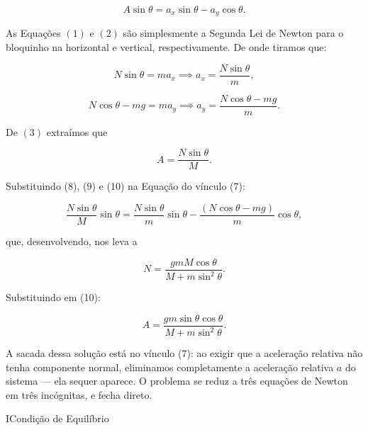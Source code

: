 \begin{exemplo}
\begin{equation*}
A \sin \theta = a_x \sin \theta - a_y \cos \theta. \tag{7}
\end{equation*}

As Equações $(1)$ e $(2)$ são simplesmente a Segunda Lei de Newton para o bloquinho na horizontal e vertical, respectivamente. De onde tiramos que:

\begin{equation*}
N \sin \theta = ma_x \implies \boxed{a_x = \dfrac{N \sin \theta}{m},} \tag{8}
\end{equation*}

\begin{equation*}
N \cos \theta - mg = ma_y \implies \boxed{a_y = \dfrac{N \cos \theta  - mg}{m}.} \tag{9}
\end{equation*}


De $(3)$ extraímos que 

\begin{equation*}
A = \dfrac{N \sin \theta }{M}. \tag{10}
\end{equation*}

Substituindo (8), (9) e (10) na Equação do vínculo (7):


$$ \dfrac{N \sin \theta }{M} \sin \theta = \dfrac{N \sin \theta}{m} \sin \theta - \dfrac{(N \cos \theta  - mg)}{m}\cos \theta,$$

\noindent que, desenvolvendo, nos leva a

$$N = \frac{gmM\cos\theta}{M + m\sin^2\theta}.$$

Substituindo em (10):

$$\boxed{A = \frac{gm\sin\theta\cos\theta}{M + m\sin^2\theta}.}$$

A sacada dessa solução está no vínculo (7): ao exigir que a aceleração relativa não tenha componente normal, eliminamos completamente a aceleração relativa $a$ do sistema
--- ela sequer aparece. O problema se reduz a três equações de Newton em três incógnitas, e fecha direto.

\end{exemplo}



\begin{secnivel}{I}{Condição de Equilíbrio}
  

\end{secnivel}







